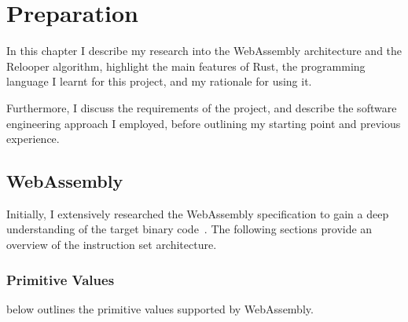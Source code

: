 \documentclass[00-main.tex]{subfiles}
\begin{document}
\chapter{Preparation}

In this chapter I describe my research into the WebAssembly architecture and the Relooper algorithm, highlight the main features of Rust, the programming language I learnt for this project, and my rationale for using it.

Furthermore, I discuss the requirements of the project, and describe the software engineering approach I employed, before outlining my starting point and previous experience.

\section{WebAssembly}

Initially, I extensively researched the WebAssembly specification to gain a deep understanding of the target binary code~.
The following sections provide an overview of the instruction set architecture.

\subsection{Primitive Values}

 below outlines the primitive values supported by WebAssembly.

\begin{table}[t]
  \centering
  \caption{Summary of the primitive types supported by WebAssembly. The `constructor' is the name of the type in code and in the specification.}
  \label{tab:wasm value types} %
\end{table}
\end{document}
